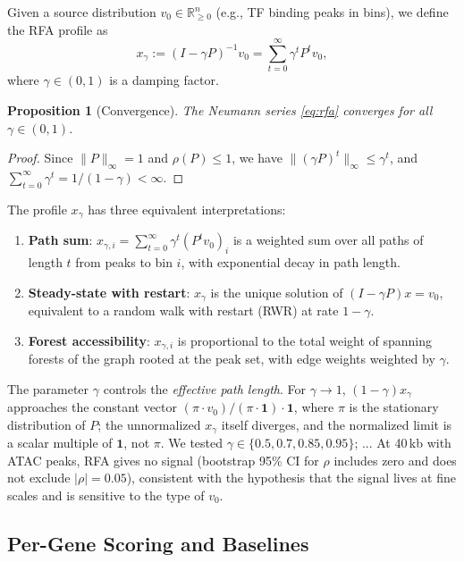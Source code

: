 \documentclass[11pt,a4paper]{article}
\newtheorem{proposition}{Proposition}
\begin{document}
Given a source distribution $v_0 \in \mathbb{R}_{\geq 0}^n$ (e.g., TF binding peaks in bins), we define the RFA profile as
\begin{equation}
x_\gamma := (I - \gamma P)^{-1} v_0 = \sum_{t=0}^{\infty} \gamma^t P^t v_0,
\label{eq:rfa}
\end{equation}
where $\gamma \in (0,1)$ is a damping factor.

\begin{proposition}[Convergence]
The Neumann series \eqref{eq:rfa} converges for all $\gamma \in (0,1)$.
\end{proposition}
\begin{proof}
Since $\|P\|_\infty = 1$ and $\rho(P) \leq 1$, we have $\|(\gamma P)^t\|_\infty \leq \gamma^t$, and $\sum_{t=0}^\infty \gamma^t = 1/(1-\gamma) < \infty$.
\end{proof}

The profile $x_\gamma$ has three equivalent interpretations:
\begin{enumerate}
    \item \textbf{Path sum}: $x_{\gamma,i} = \sum_{t=0}^\infty \gamma^t (P^t v_0)_i$ is a weighted sum over all paths of length $t$ from peaks to bin $i$, with exponential decay in path length.
    \item \textbf{Steady-state with restart}: $x_\gamma$ is the unique solution of $(I - \gamma P) x = v_0$, equivalent to a random walk with restart (RWR) at rate $1-\gamma$.
    \item \textbf{Forest accessibility}: $x_{\gamma,i}$ is proportional to the total weight of spanning forests of the graph rooted at the peak set, with edge weights weighted by $\gamma$.
\end{enumerate}

The parameter $\gamma$ controls the \emph{effective path length}. For $\gamma \to 1$, $(1-\gamma)x_\gamma$ approaches the constant vector $(\pi\cdot v_0)/(\pi\cdot\mathbf{1})\cdot\mathbf{1}$, where $\pi$ is the stationary distribution of $P$; the unnormalized $x_\gamma$ itself diverges, and the normalized limit is a scalar multiple of $\mathbf{1}$, not $\pi$. We tested $\gamma \in \{0.5, 0.7, 0.85, 0.95\}$; ... At 40\,kb with ATAC peaks, RFA gives no signal (bootstrap 95\% CI for $\rho$ includes zero and does not exclude $|\rho|=0.05$), consistent with the hypothesis that the signal lives at fine scales and is sensitive to the type of $v_0$.

\subsection{Per-Gene Scoring and Baselines}
\end{document}
